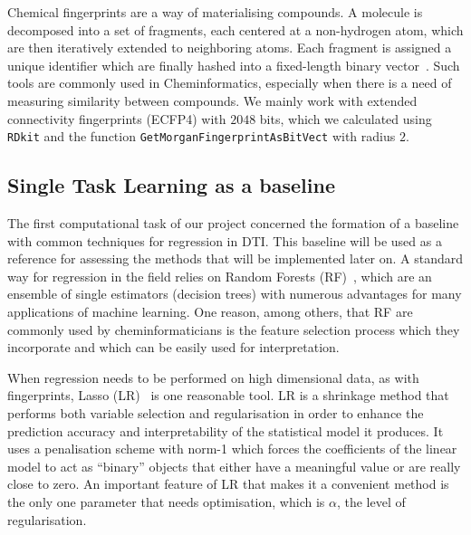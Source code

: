 \documentclass[10pt]{article}
\begin{document}
Chemical fingerprints are a way of materialising compounds. A molecule is decomposed into a set of fragments, each centered at a non-hydrogen atom, which are then iteratively extended to neighboring atoms. Each fragment is assigned a unique identifier which are finally hashed into a fixed-length binary vector~\cite{ramsundar2015massively}. Such tools are commonly used in Cheminformatics, especially when there is a need of measuring similarity between compounds. We mainly work with extended connectivity fingerprints (ECFP4)  with $2048$ bits, which we calculated using \texttt{RDkit} and the function \texttt{GetMorganFingerprintAsBitVect} with radius $2$. 

\subsection{Single Task Learning as a baseline}

The first computational task of our project concerned the formation of a baseline with common techniques for regression in DTI. This baseline will be used as a reference for assessing the methods that will be implemented later on. A standard way for regression in the field relies on Random Forests (RF)~\cite{martin2017profile,whitehead2019imputation,colwell2018statistical}, which are an ensemble of single estimators (decision trees) with numerous advantages for many applications of machine learning. One reason, among others, that RF are commonly used by cheminformaticians is the feature selection process which they incorporate and which can be easily used for interpretation. 

When regression needs to be performed on high dimensional data, as with fingerprints, Lasso (LR)~\cite{tibshirani1996regression} is one reasonable tool. LR is a shrinkage method that performs both variable selection and regularisation in order to enhance the prediction accuracy and interpretability of the statistical model it produces. It uses a penalisation scheme with norm-1 which forces the coefficients of the linear model to act as ``binary'' objects that either have a meaningful value or are really close to zero.  An important feature of LR that makes it a convenient method is the only one parameter that needs optimisation, which is $\alpha$, the level of regularisation. 
\end{document}
